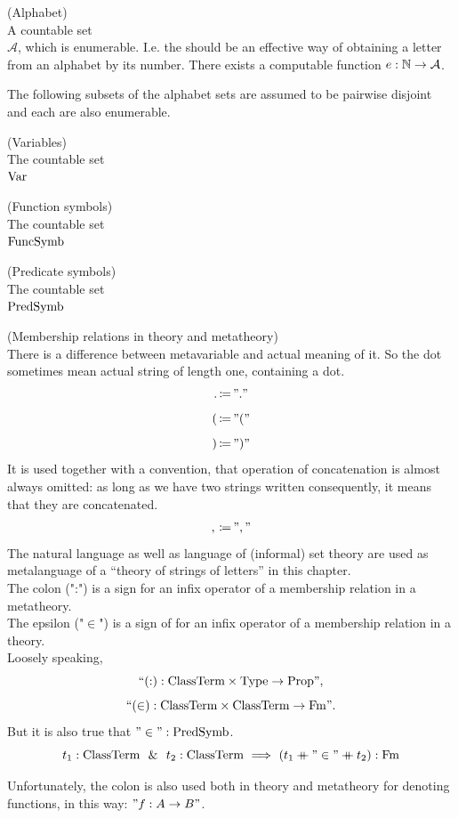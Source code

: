 


\begin{definition}(Alphabet)\\
A countable set\\
$\mathcal{A}$, which is enumerable.
I.e. the should be an effective way of obtaining a letter from an alphabet by its number.
There exists a computable function $e:\mathbb{N}\to\mathcal{A}$.
\end{definition}
The following subsets of the alphabet sets are assumed to be pairwise disjoint and each are also enumerable.
\begin{definition}(Variables)\\
The countable set \\
$\mathrm{Var}$
\end{definition}
\begin{definition}(Function symbols)\\
The countable set \\
$\mathrm{FuncSymb}$
\end{definition}
\begin{definition}(Predicate symbols)\\
The countable set \\
$\mathrm{PredSymb}$
\end{definition}

\begin{notation}(Membership relations in theory and metatheory)\\
There is a difference between metavariable and actual meaning of it.
So the dot sometimes mean actual string of length one, containing a dot.
\[
.\,{\coloneqq}\, "."
\]
\[
(\,{\coloneqq}\, "("
\]
\[
)\,{\coloneqq}\, ")"
\]
It is used together with a convention, that operation of concatenation is almost always omitted: as long as we have two strings written consequently, it means that they are concatenated.
\[
,\,{\coloneqq}\, ","
\]
The natural language as well as language of (informal) set theory are used as metalanguage of a ``theory of strings of letters'' in this chapter.\\

The colon (":") is a sign for an infix operator of a membership relation in a metatheory.\\
The epsilon ("$\in$") is a sign of for an infix operator of a membership relation in a theory.\\
Loosely speaking, 
\[
``\mathbf{(:)} :  {\text{ClassTerm}} \times \mathrm{Type} \to \mathrm{Prop}",
\]
\[
``\mathbf{(\in)} :  {\text{ClassTerm}} \times {\text{ClassTerm}} \to \mathrm{Fm}".
\]
But it is also true that $"\in":\mathrm{PredSymb}$. 
\[
t_1:{\text{ClassTerm}} \ \ \&\ \  t_2:{\text{ClassTerm}} \ \Longrightarrow\  (t_1\mathbin{+\mkern-10mu+}"\in"\mathbin{+\mkern-10mu+} t_2):\mathrm{Fm}
\]

Unfortunately, the colon is also used both in theory and metatheory for denoting functions, in this way: $"f:A\to B"$.
\end{notation}

